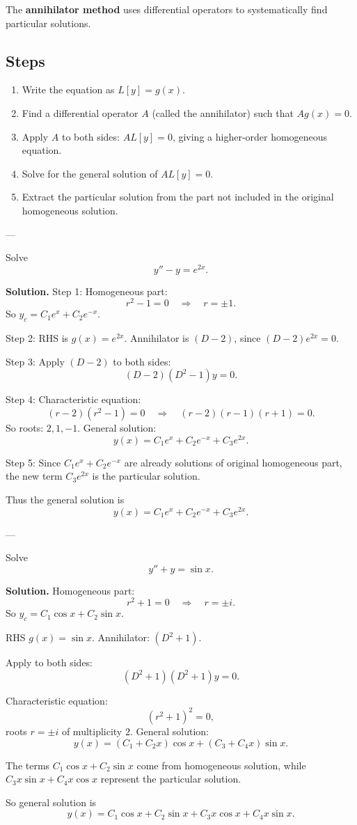 The \textbf{annihilator method} uses differential operators to systematically find particular solutions.

\subsection*{Steps}
\begin{enumerate}
    \item Write the equation as $L[y]=g(x)$.
    \item Find a differential operator $A$ (called the annihilator) such that $Ag(x)=0$.
    \item Apply $A$ to both sides: $AL[y]=0$, giving a higher-order homogeneous equation.
    \item Solve for the general solution of $AL[y]=0$.
    \item Extract the particular solution from the part not included in the original homogeneous solution.
\end{enumerate}

---

\begin{example}
Solve
\[
y''-y=e^{2x}.
\]

\textbf{Solution.}  
Step 1: Homogeneous part:
\[
r^2-1=0 \quad \Rightarrow \quad r=\pm1.
\]
So $y_c=C_1e^x+C_2e^{-x}$.

Step 2: RHS is $g(x)=e^{2x}$. Annihilator is $(D-2)$, since $(D-2)e^{2x}=0$.

Step 3: Apply $(D-2)$ to both sides:
\[
(D-2)(D^2-1)y=0.
\]

Step 4: Characteristic equation:
\[
(r-2)(r^2-1)=0 \quad \Rightarrow \quad (r-2)(r-1)(r+1)=0.
\]
So roots: $2,1,-1$. General solution:
\[
y(x)=C_1e^x+C_2e^{-x}+C_3e^{2x}.
\]

Step 5: Since $C_1e^x+C_2e^{-x}$ are already solutions of original homogeneous part, the new term $C_3e^{2x}$ is the particular solution.

Thus the general solution is
\[
y(x)=C_1e^x+C_2e^{-x}+C_3e^{2x}.
\]
\end{example}

---

\begin{example}
Solve
\[
y''+y=\sin x.
\]

\textbf{Solution.}  
Homogeneous part:
\[
r^2+1=0 \quad \Rightarrow \quad r=\pm i.
\]
So $y_c=C_1\cos x+C_2\sin x$.

RHS $g(x)=\sin x$. Annihilator: $(D^2+1)$.

Apply to both sides:
\[
(D^2+1)(D^2+1)y=0.
\]

Characteristic equation:
\[
(r^2+1)^2=0,
\]
roots $r=\pm i$ of multiplicity $2$.  
General solution:
\[
y(x)=(C_1+C_2x)\cos x+(C_3+C_4x)\sin x.
\]

The terms $C_1\cos x+C_2\sin x$ come from homogeneous solution, while $C_3x\sin x+C_4x\cos x$ represent the particular solution.

So general solution is
\[
y(x)=C_1\cos x+C_2\sin x+C_3x\cos x+C_4x\sin x.
\]
\end{example}

